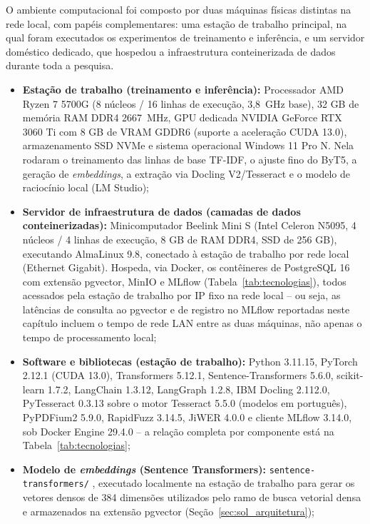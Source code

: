 O ambiente computacional foi composto por duas máquinas físicas distintas na rede local, com papéis complementares: uma estação de trabalho principal, na qual foram executados os experimentos de treinamento e inferência, e um servidor doméstico dedicado, que hospedou a infraestrutura conteinerizada de dados durante toda a pesquisa.
\begin{itemize}
	\item \textbf{Estação de trabalho (treinamento e inferência):} Processador AMD Ryzen 7 5700G (8 núcleos / 16 linhas de execução, 3,8~GHz base), 32 GB de memória RAM DDR4 2667~MHz, GPU dedicada NVIDIA GeForce RTX 3060 Ti com 8 GB de VRAM GDDR6 (suporte a aceleração CUDA 13.0), armazenamento SSD NVMe e sistema operacional Windows 11 Pro N. Nela rodaram o treinamento das linhas de base TF-IDF, o ajuste fino do ByT5, a geração de \textit{embeddings}, a extração via Docling V2/Tesseract e o modelo de raciocínio local (LM Studio);
	\item \textbf{Servidor de infraestrutura de dados (camadas de dados conteinerizadas):} Minicomputador Beelink Mini S (Intel Celeron N5095, 4 núcleos / 4 linhas de execução, 8 GB de RAM DDR4, SSD de 256 GB), executando AlmaLinux 9.8, conectado à estação de trabalho por rede local (Ethernet Gigabit). Hospeda, via Docker, os contêineres de PostgreSQL 16 com extensão pgvector, MinIO e MLflow (Tabela~\ref{tab:tecnologias}), todos acessados pela estação de trabalho por IP fixo na rede local -- ou seja, as latências de consulta ao pgvector e de registro no MLflow reportadas neste capítulo incluem o tempo de rede LAN entre as duas máquinas, não apenas o tempo de processamento local;
	\item \textbf{Software e bibliotecas (estação de trabalho):} Python 3.11.15, PyTorch 2.12.1 (CUDA 13.0), Transformers 5.12.1, Sentence-Transformers 5.6.0, scikit-learn 1.7.2, LangChain 1.3.12, LangGraph 1.2.8, IBM Docling 2.112.0, PyTesseract 0.3.13 sobre o motor Tesseract 5.5.0 (modelos em português), PyPDFium2 5.9.0, RapidFuzz 3.14.5, JiWER 4.0.0 e cliente MLflow 3.14.0, sob Docker Engine 29.4.0 -- a relação completa por componente está na Tabela~\ref{tab:tecnologias};
	\item \textbf{Modelo de \textit{embeddings} (Sentence Transformers):} \texttt{sentence-transformers/}\allowbreak\modelemb{} \cite{reimers2019sentence, reimers2020multilingual}, executado localmente na estação de trabalho para gerar os vetores densos de 384 dimensões utilizados pelo ramo de busca vetorial densa e armazenados na extensão pgvector (Seção~\ref{sec:sol_arquitetura});

\end{itemize}
